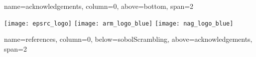 \documentclass[a0paper,portrait,fontscale=0.40]{baposter}
\begin{document}
\begin{poster}
{  }

  {name=acknowledgements, column=0, above=bottom, span=2}
  {
  	\begin{center}
  		\begin{minipage}[t]{0.95\linewidth}
  			\texttt{[image: epsrc\_logo]} 
  			\hfill
  			\texttt{[image: arm\_logo\_blue]}
  			\hfill
  			\texttt{[image: nag\_logo\_blue]}
  		\end{minipage}
  	\end{center}
  	
  }


{name=references, column=0,  below=sobolScrambling, above=acknowledgements, span=2}
{
	\renewcommand{\section}[2]{\vspace{0.05em}} %

	\begin{multicols}{2}
		
	\end{multicols}

}


\end{poster}
\end{document}
